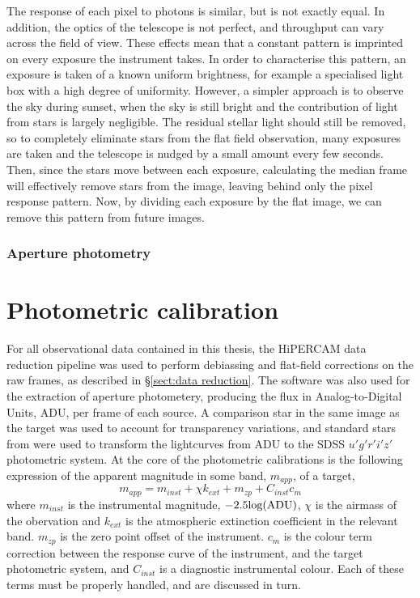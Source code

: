 The response of each pixel to photons is similar, but is not exactly equal. In addition, the optics of the telescope is not perfect, and throughput can vary across the field of view. These effects mean that a constant pattern is imprinted on every exposure the instrument takes. 
In order to characterise this pattern, an exposure is taken of a known uniform brightness, for example a specialised light box with a high degree of uniformity. 
However, a simpler approach is to observe the sky during sunset, when the sky is still bright and the contribution of light from stars is largely negligible. 
The residual stellar light should still be removed, so to completely eliminate stars from the flat field observation, many exposures are taken and the telescope is nudged by a small amount every few seconds. Then, since the stars move between each exposure, calculating the median frame will effectively remove stars from the image, leaving behind only the pixel response pattern. 
Now, by dividing each exposure by the flat image, we can remove this pattern from future images. 


\subsubsection{Aperture photometry}


\section{Photometric calibration}
\label{sect:photometric extraction and calibration}

For all observational data contained in this thesis, the HiPERCAM data reduction pipeline \citep{dhillon2016} was used to perform debiassing and flat-field corrections on the raw frames, as described in \S\ref{sect:data reduction}. The software was also used for the extraction of aperture photometery, producing the flux in Analog-to-Digital Units, ADU, per frame of each source. 
A comparison star in the same image as the target was used to account for transparency variations, and standard stars from \citet{smith2002} were used to transform the lightcurves from ADU to the SDSS $u'g'r'i'z'$ photometric system. At the core of the photometric calibrations is the following expression of the apparent magnitude in some band, $m_{app}$, of a target,
\begin{equation}
    \label{eqn:observations:instrumental magnitude from scratch}
    m_{app} = m_{inst} + \chi k_{ext} + m_{zp} + C_{inst}c_{m}
\end{equation}
where $m_{inst}$ is the instrumental magnitude, $-2.5 \rm log(ADU)$, $\chi$ is the airmass of the obervation and $k_{ext}$ is the atmospheric extinction coefficient in the relevant band. $m_{zp}$ is the zero point offset of the instrument. $c_{m}$ is the colour term correction between the response curve of the instrument, and the target photometric system, and $C_{inst}$ is a diagnostic instrumental colour. Each of these terms must be properly handled, and are discussed in turn. 


